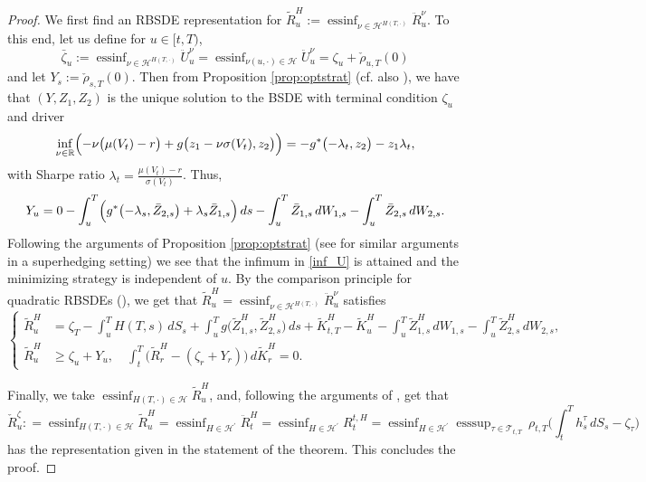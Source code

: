 \documentclass{article}
\DeclareMathOperator*{\essinf}{ess inf}
\DeclareMathOperator*{\esssup}{ess sup}
\begin{document}
\begin{proof}
	We first find an RBSDE representation for $\tilde{R}_u^H:=\essinf_{\nu \in \mathcal H^{H(T,\cdot)}}  \ddot{R}^\nu_{u}$. To this end, let us define for $u\in [t,T)$,
	\begin{equation}\label{inf_U}
		\bar{\zeta}_u := \essinf_{\nu \in \mathcal H^{H(T,\cdot)}} \ddot{U}_{u}^\nu = \essinf_{\nu(u, \cdot) \in \mathcal H} \ddot{U}_{u}^\nu  = \zeta_u +
		\check{\rho}_{u,T}(0)
	\end{equation}
	and let $Y_s :=\check{\rho}_{s,T}(0)$. Then from Proposition \ref{prop:optstrat} (cf. also \cite[Proposition 2.7]{SS15}), we have that $(Y, Z_1, Z_2)$ is the unique solution to the BSDE with terminal condition
	$\zeta_u$ and driver 
	\[
 		\inf_{\nu\in \mathbb{R}} \Bigl( - \nu\bigl(\mu(V_t)-r\bigr) + g\bigl(z_1-\nu\sigma(V_t), z_2\bigr)\Bigr)= -g^*\bigl(-\lambda_t, z_2\bigr) -z_1\lambda_t,
	\]
	with Sharpe ratio $\lambda_t = \frac{\mu(V_t)-r}{\sigma(V_t)}$. Thus,
	\[
		Y_u = 0 -\int_u^T \Bigl( g^*\bigl(-\lambda_s, \bar{Z}_{2,s}\bigr) +  \lambda_s\bar{Z}_{1,s}\Bigr) \, ds  -\int_u^T\bar{Z}_{1,s} \,dW_{1,s} -
		\int_u^T\bar{Z}_{2,s} \,dW_{2,s}.
	\]
	Following the arguments of Proposition \ref{prop:optstrat} (see \cite[Theorem 7.17]{KS05} for similar arguments in a superhedging setting) we see that the infimum in \eqref{inf_U}  is attained and the minimizing strategy is independent of $u$. By the
	comparison principle for quadratic RBSDEs (\cite[Proposition 3.2]{KLQT02}), we get that
	$\tilde{R}^H_{u} = \essinf_{\nu \in \mathcal H^{H(T,\cdot)}}  \ddot{R}^\nu_{u}$ satisfies
	\[
		\left\{\begin{array}{ll}
		\tilde{R}^H_{u} &=  \zeta_T - \int_u^T H(T, s) \, dS_s +\int_u^T g\bigl(\tilde{Z}_{1,s}^{H}, \tilde{Z}_{2,s}^{H}\bigr) \, ds +\tilde{K}_{t,T}^H -
		\tilde{K}_{u}^H-\int_u^T \tilde{Z}^{H}_{1,s} \, dW_{1,s} - \int_u^T \tilde{Z}_{2,s}^{H} \, dW_{2,s}, \\
		\tilde{R}^H_{u} &\geq \zeta_u + Y_u, \quad \int_t^T\bigl(\tilde{R}^H_{r} -(\zeta_r + Y_r)\bigr) \, d\tilde{K}_{r}^H=0.
		\end{array} \right.
	\]

	Finally, we take $\essinf_{H(T, \cdot) \in \mathcal H} \tilde{R}_{u}^H$, and, following the arguments of \cite[Theorem 7.17]{KS05}, get that
	\[
		\check{R}^\zeta_u : = \essinf_{H(T, \cdot) \in \mathcal H} \tilde{R}_{u}^H =\essinf_{H\in \mathcal H^\prime} \ddot{R}_t^H= \essinf_{H\in \mathcal H^\prime}
		R_t^{t,H}= \essinf_{H\in \mathcal H^\prime} \esssup_{\tau\in \mathcal{T}_{t,T}}\, \rho_{t,T}\biggl(\int_t^T h_s^\tau \, dS_s -\zeta_\tau\biggr)
	\] 
	has the representation given in the statement of the theorem. This concludes the proof.
\end{proof}
\end{document}
